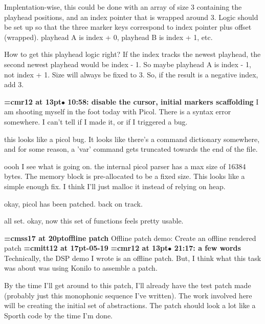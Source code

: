 Implentation-wise, this could be done with an array of size 3 containing the playhead positions, and an index pointer that is wrapped around 3. Logic should be set up so that the three marker keys correspond to index pointer plus offset (wrapped). playhead A is index + 0, playhead B is index + 1, etc.
\par

How to get this playhead logic right? If the index tracks the newest playhead, the second newest playhead would be index - 1. So maybe playhead A is index - 1, not index + 1. Size will always be fixed to 3. So, if the result is a negative index, add 3.
\par

{\smallskip\noindent\bf\font\titlefont=cmr12 at 13pt\titlefont $\bullet$ 10:58: disable the cursor, initial markers scaffolding}\smallskip
I am shooting myself in the foot today with Picol. There is a syntax error somewhere. I can't tell if I made it, or if I triggered a bug.
\par

this looks like a picol bug. It looks like there's a command dictionary somewhere, and for some reason, a 'var' command gets truncated towards the end of the file.
\par

oooh I see what is going on. the internal picol parser has a max size of 16384 bytes. The memory block is pre-allocated to be a fixed size. This looks like a simple enough fix. I think I'll just malloc it instead of relying on heap.
\par

okay, picol has been patched. back on track.
\par

all set. okay, now this set of functions feels pretty usable.
\par

{\medskip\noindent\bf\font\titlefont=cmss17 at 20pt\titlefont offline patch}\medskip
Offline patch demo: Create an offline rendered patch
{\medskip\noindent\bf\font\titlefont=cmitt12 at 17pt-05-19}\medskip
{\smallskip\noindent\bf\font\titlefont=cmr12 at 13pt\titlefont $\bullet$ 21:17: a few words}\smallskip
Technically, the DSP demo I wrote is an offline patch. But, I think what this task was about was using Konilo to assemble a patch.
\par

By the time I'll get around to this patch, I'll already have the test patch made (probably just this monophonic sequence I've written). The work involved here will be creating the initial set of abstractions. The patch should look a lot like a Sporth code by the time I'm done.
\par

